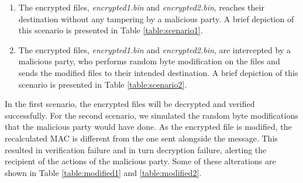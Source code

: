 \documentclass[a4paper]{cas-sc}
\begin{document}
\begin{enumerate}
    \item The encrypted files, \textit{encrypted1.bin} and \textit{encrypted2.bin}, reaches their destination without any tampering by a malicious party. A brief depiction of this scenario is presented in Table \ref{table:scenario1}.
    \item The encrypted files, \textit{encrypted1.bin} and \textit{encrypted2.bin}, are intercepted by a malicious party, who performs random byte modification on the files and sends the modified files to their intended destination. A brief depiction of this scenario is presented in Table \ref{table:scenario2}.
\end{enumerate}
In the first scenario, the encrypted files will be decrypted and verified successfully. For the second scenario, we simulated the random byte modifications that the malicious party would have done. As the encrypted file is modified, the recalculated MAC is different from the one sent alongside the message. This resulted in verification failure and in turn decryption failure, alerting the recipient of the actions of the malicious party. Some of these alterations are shown in Table \ref{table:modified1} and \ref{table:modified2}.
\end{document}
